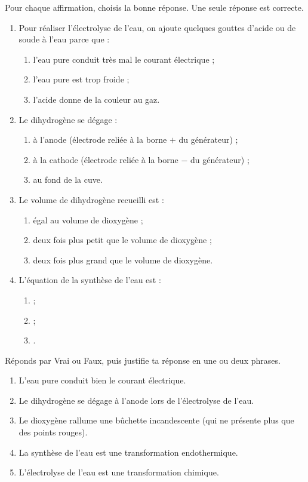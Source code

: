 \documentclass[11pt]{article}
\begin{document}
\begin{exercice}
Pour chaque affirmation, choisis la bonne réponse. Une seule réponse est correcte.
\begin{enumerate}
\item Pour réaliser l'électrolyse de l'eau, on ajoute quelques gouttes d'acide ou de soude à l'eau parce que :
\begin{enumerate}
\item l'eau pure conduit très mal le courant électrique ;
\item l'eau pure est trop froide ;
\item l'acide donne de la couleur au gaz.
\end{enumerate}
\item Le dihydrogène se dégage :
\begin{enumerate}
\item à l'anode (électrode reliée à la borne $+$ du générateur) ;
\item à la cathode (électrode reliée à la borne $-$ du générateur) ;
\item au fond de la cuve.
\end{enumerate}
\item Le volume de dihydrogène recueilli est :
\begin{enumerate}
\item égal au volume de dioxygène ;
\item deux fois plus petit que le volume de dioxygène ;
\item deux fois plus grand que le volume de dioxygène.
\end{enumerate}
\item L'équation de la synthèse de l'eau est :
\begin{enumerate}
\item {} ;
\item {} ;
\item {}.
\end{enumerate}
\end{enumerate}
\end{exercice}

\begin{exercice}
Réponds par Vrai ou Faux, puis justifie ta réponse en une ou deux phrases.
\begin{enumerate}
\item L'eau pure conduit bien le courant électrique.
\item Le dihydrogène se dégage à l'anode lors de l'électrolyse de l'eau.
\item Le dioxygène rallume une bûchette incandescente (qui ne présente plus que des points rouges).
\item La synthèse de l'eau est une transformation endothermique.
\item L'électrolyse de l'eau est une transformation chimique.
\end{enumerate}
\end{exercice}
\end{document}
